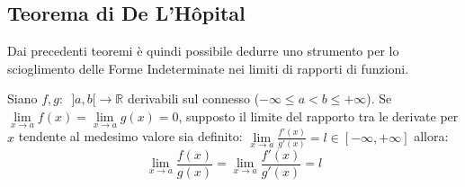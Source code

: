 \documentclass[10pt]{article}
\theoremstyle{plain}
\begin{document}
\subsection{Teorema di De L'H\^opital}
Dai precedenti teoremi è quindi possibile dedurre uno strumento per lo scioglimento delle Forme Indeterminate nei limiti di rapporti di funzioni.
\begin{ther}[\textbf{T. di De L'H.}]
Siano $f,g : \enspace ]a, b[ \rightarrow \mathbb{R}$ derivabili sul connesso ($- \infty \leq a < b \leq + \infty$). Se $\lim \limits_{x \rightarrow a} f(x) = \lim \limits_{x \rightarrow a} g(x) = 0$, supposto il limite del rapporto tra le derivate per $x$ tendente al medesimo valore sia definito: $\lim \limits_{x \rightarrow a} \frac{f'(x)}{g'(x)} = l \in [- \infty, + \infty]$ allora:
\[\lim \limits_{x \rightarrow a} \frac{f(x)}{g(x)} = \lim \limits_{x \rightarrow a} \frac{f'(x)}{g'(x)} = l\]
\end{ther}
\end{document}
